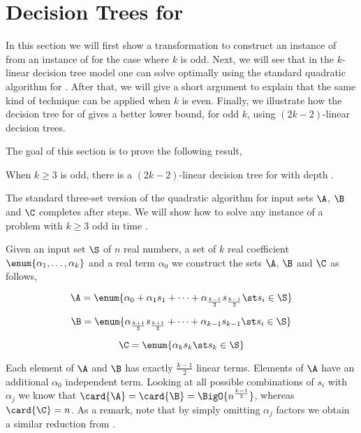\section{Decision Trees for \kLDT}
\label{tree:3sum:kldt}

In this section we will first show a transformation to construct an instance
of \threeSUM from an instance of \kLDT for the case where \(k\) is odd. Next, we will
see that in the \(k\)-linear decision tree model one can solve \kLDT optimally
using the standard quadratic algorithm for \threeSUM. After that, we will give a
short argument to explain that the same kind of technique can be applied when
\(k\) is even. Finally, we illustrate how the decision tree for \threeSUM of
\citet*{gronlund:2014} gives a better lower bound, for odd \(k\), using
\((2k-2)\)-linear decision trees.

The goal of this section is to prove the following result,

\begin{theorem}
When $k \ge 3$ is odd, there is a $(2k-2)$-linear decision tree for \kLDT with
depth .
\end{theorem}

The standard three-set version of the quadratic \threeSUM algorithm for input
sets \(\A\), \(\B\) and \(\C\) completes after \BigO{\card{\C} ( \card{\A} +
\card{\B} ) } steps. We will show how to solve any instance of a \kLDT problem
with \(k \ge 3\) odd in time .

Given an input set \(\S\) of \(n\) real numbers, a set of \(k\) real
coefficient \( \enum{\alpha_1,\ldots,\alpha_k}\) and a real term \(\alpha_0\)
we construct the sets \(\A\), \(\B\) and \(\C\) as follows,

\begin{displaymath}
\A = \enum{\alpha_0 + \alpha_1 s_1 + \cdots + \alpha_{\frac{k-1}{2}} s_{\frac{k-1}{2}} \st s_i \in \S}
\end{displaymath}

\begin{displaymath}
\B = \enum{\alpha_{\frac{k+1}{2}} s_{\frac{k+1}{2}} + \cdots + \alpha_{k-1} s_{k-1} \st s_i \in \S}
\end{displaymath}

\begin{displaymath}
\C = \enum{\alpha_k s_k \st s_k \in \S}
\end{displaymath}

Each element of \(\A\) and \(\B\) has exactly \(\frac{k-1}{2}\) linear terms.
Elements of \(\A\) have an additional \(\alpha_0\) independent term. Looking
at all possible combinations of \(s_i\) with \(\alpha_j\) we know that
\(\card{\A} = \card{\B} = \BigO{n^{\frac{k-1}{2}}}\), whereas \(\card{\C} =
n\). As a remark, note that by simply omitting \(\alpha_j\) factors we obtain a
similar reduction from \kSUM.

